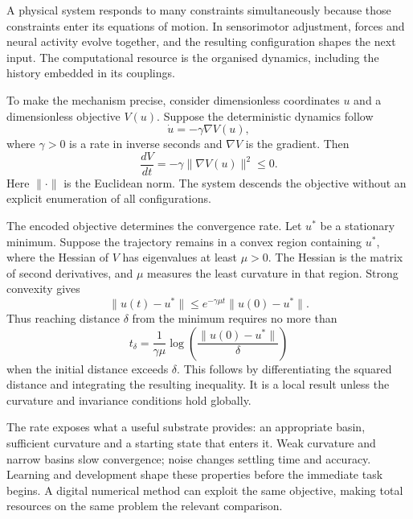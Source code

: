 \documentclass[11pt,a4paper]{article}
\begin{document}
A physical system responds to many constraints simultaneously because those constraints enter its equations of motion. In sensorimotor adjustment, forces and neural activity evolve together, and the resulting configuration shapes the next input. The computational resource is the organised dynamics, including the history embedded in its couplings.

To make the mechanism precise, consider dimensionless coordinates \(u\) and a dimensionless objective \(V(u)\). Suppose the deterministic dynamics follow
\begin{equation}
 \dot u=-\gamma\nabla V(u),
 \label{eq:gradient}
\end{equation}
where \(\gamma>0\) is a rate in inverse seconds and \(\nabla V\) is the gradient. Then
\begin{equation}
 \frac{dV}{dt}=-\gamma\|\nabla V(u)\|^2\leq0.
 \label{eq:descent}
\end{equation}
Here \(\|\cdot\|\) is the Euclidean norm. The system descends the objective without an explicit enumeration of all configurations.

The encoded objective determines the convergence rate. Let \(u^\ast\) be a stationary minimum. Suppose the trajectory remains in a convex region containing \(u^\ast\), where the Hessian of \(V\) has eigenvalues at least \(\mu>0\). The Hessian is the matrix of second derivatives, and \(\mu\) measures the least curvature in that region. Strong convexity gives
\begin{equation}
 \|u(t)-u^\ast\|
 \leq e^{-\gamma\mu t}\|u(0)-u^\ast\|.
 \label{eq:localrate}
\end{equation}
Thus reaching distance \(\delta\) from the minimum requires no more than
\begin{equation}
 t_\delta=\frac{1}{\gamma\mu}
 \log\!\left(\frac{\|u(0)-u^\ast\|}{\delta}\right)
 \label{eq:relaxation}
\end{equation}
when the initial distance exceeds \(\delta\). This follows by differentiating the squared distance and integrating the resulting inequality. It is a local result unless the curvature and invariance conditions hold globally.

The rate exposes what a useful substrate provides: an appropriate basin, sufficient curvature and a starting state that enters it. Weak curvature and narrow basins slow convergence; noise changes settling time and accuracy. Learning and development shape these properties before the immediate task begins. A digital numerical method can exploit the same objective, making total resources on the same problem the relevant comparison.
\end{document}
